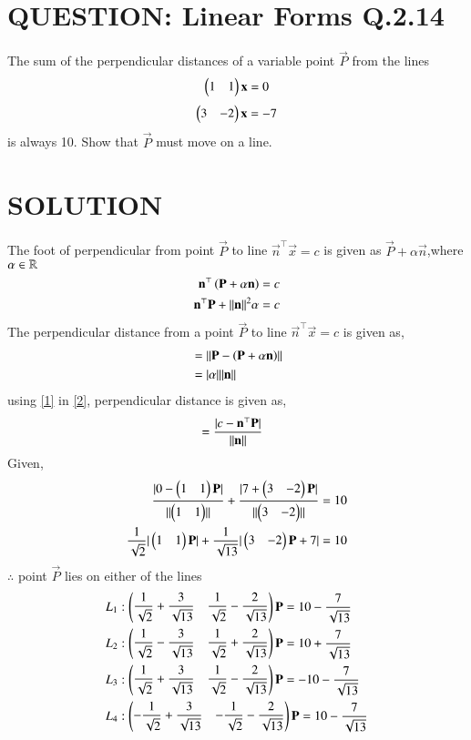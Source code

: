 \documentclass[journal,12pt,twocolumn]{IEEEtran}
\begin{document}
\section{QUESTION: Linear Forms Q.2.14}
The sum of the perpendicular distances of a variable point $\vec{P}$ from the lines 
$$\begin{pmatrix}1&1\end{pmatrix} \mathbf{x} = 0$$
$$\begin{pmatrix}3&-2\end{pmatrix} \mathbf{x} = -7$$
is always 10. Show that $\vec{P}$ must move on a line.

\section{SOLUTION}
The foot of perpendicular from point $\vec{P}$ to line $ \vec{n}^{\top }\vec{x} =c$ is given as $\vec{P} + \alpha \vec{n}$,where $\alpha \in \mathbb{R}$
\begin{align}
\mathbf{n}^{\top }\left(\mathbf{P} + \alpha\mathbf{n}\right) = c\\
 \mathbf{n}^{\top }\mathbf{P} + \lVert\mathbf{n}\rVert^{2}\alpha =c \label{1}
\end{align}
The perpendicular distance from a point $\vec{P}$ to line $ \vec{n}^{\top }\vec{x} =c$ is given as,
\begin{align}
&=\lVert\mathbf{P} - \left(\mathbf{P} + \alpha\mathbf{n}\right)\rVert\\
&=\vert\alpha\vert\lVert\mathbf{n}\rVert \label{2}
\end{align}
using \eqref{1} in \eqref{2}, perpendicular distance is given as,
\begin{align}
&=\dfrac{\vert c- \mathbf{n}^{\top }\mathbf{P}\vert}{\lVert\mathbf{n}\rVert} \label{3}
\end{align}
Given,
\begin{align}
\dfrac{\vert0- \begin{pmatrix}1&1\end{pmatrix} \mathbf{P}\vert}{\lVert\begin{pmatrix}1&1\end{pmatrix}\rVert} + \dfrac{\vert7+ \begin{pmatrix}3&-2\end{pmatrix} \mathbf{P}\vert}{\lVert\begin{pmatrix}3&-2\end{pmatrix}\rVert}=10\\
\dfrac{1}{\sqrt{2}} \vert\begin{pmatrix}1&1\end{pmatrix}\mathbf{P}\vert + \dfrac{1}{\sqrt{13}} \vert\begin{pmatrix}3&-2\end{pmatrix}\mathbf{P} +7\vert = 10
\end{align}
$\therefore$ point $\vec{P}$ lies on either of the lines
\begin{align}
L_1&:\begin{pmatrix}\dfrac{1}{\sqrt{2}}+\dfrac{3}{\sqrt{13}}& \dfrac{1}{\sqrt{2}}-\dfrac{2}{\sqrt{13}}\end{pmatrix}\mathbf{P} = 10 - \dfrac{7}{\sqrt{13}}\\
L_2&:\begin{pmatrix}\dfrac{1}{\sqrt{2}}-\dfrac{3}{\sqrt{13}}& \dfrac{1}{\sqrt{2}}+\dfrac{2}{\sqrt{13}}\end{pmatrix}\mathbf{P} = 10 + \dfrac{7}{\sqrt{13}}\\
L_3&:\begin{pmatrix}\dfrac{1}{\sqrt{2}}+\dfrac{3}{\sqrt{13}}& \dfrac{1}{\sqrt{2}}-\dfrac{2}{\sqrt{13}}\end{pmatrix}\mathbf{P} = -10 - \dfrac{7}{\sqrt{13}}\\
L_4&:\begin{pmatrix}-\dfrac{1}{\sqrt{2}}+\dfrac{3}{\sqrt{13}}& -\dfrac{1}{\sqrt{2}}-\dfrac{2}{\sqrt{13}}\end{pmatrix}\mathbf{P} = 10 - \dfrac{7}{\sqrt{13}}
\end{align}
\end{document}
